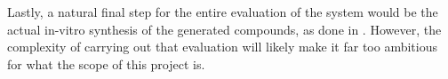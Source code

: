 \documentclass{article}
\begin{document}
Lastly, a natural final step for the entire evaluation of the system would be the actual
 in-vitro synthesis of the generated compounds, as done in \cite{Zhavoronkov2019}.
 However, the complexity of carrying out that evaluation will likely make it far too
 ambitious for what the scope of this project is.
 









    
\end{document}

